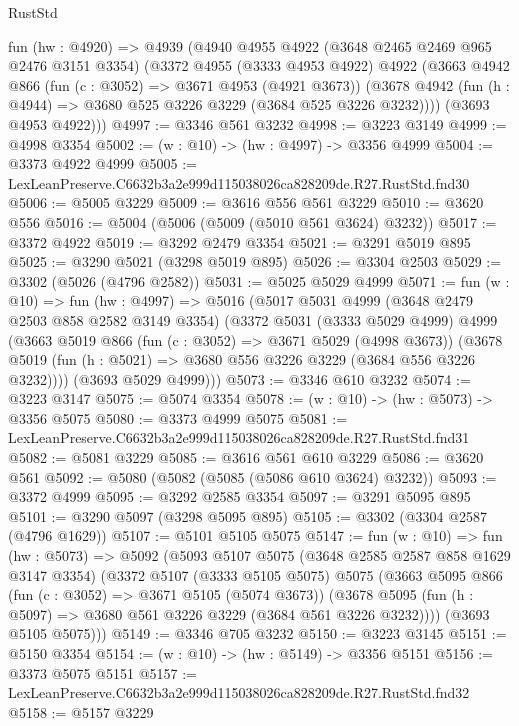 \begin{lexlean}{RustStd}
\begin{coremodule}
  fun (hw : @4920) =>
  @4939
    (@4940
      @4955
      @4922
      (@3648 @2465 @2469 @965 @2476 @3151 @3354)
      (@3372
        @4955
        (@3333 @4953 @4922)
        @4922
        (@3663
          @4942
          @866
          (fun (c : @3052) => @3671 @4953 (@4921 @3673))
          (@3678 @4942 (fun (h : @4944) => @3680 @525 @3226 @3229 (@3684 @525 @3226 @3232))))
        (@3693 @4953 @4922)))
@4997 := @3346 @561 @3232
@4998 := @3223 @3149
@4999 := @4998 @3354
@5002 := (w : @10) -> (hw : @4997) -> @3356 @4999
@5004 := @3373 @4922 @4999
@5005 := LexLeanPreserve.C6632b3a2e999d115038026ca828209de.R27.RustStd.fnd30
@5006 := @5005 @3229
@5009 := @3616 @556 @561 @3229
@5010 := @3620 @556
@5016 := @5004 (@5006 (@5009 (@5010 @561 @3624) @3232))
@5017 := @3372 @4922
@5019 := @3292 @2479 @3354
@5021 := @3291 @5019 @895
@5025 := @3290 @5021 (@3298 @5019 @895)
@5026 := @3304 @2503
@5029 := @3302 (@5026 (@4796 @2582))
@5031 := @5025 @5029 @4999
@5071 := fun (w : @10) =>
  fun (hw : @4997) =>
  @5016
    (@5017
      @5031
      @4999
      (@3648 @2479 @2503 @858 @2582 @3149 @3354)
      (@3372
        @5031
        (@3333 @5029 @4999)
        @4999
        (@3663
          @5019
          @866
          (fun (c : @3052) => @3671 @5029 (@4998 @3673))
          (@3678 @5019 (fun (h : @5021) => @3680 @556 @3226 @3229 (@3684 @556 @3226 @3232))))
        (@3693 @5029 @4999)))
@5073 := @3346 @610 @3232
@5074 := @3223 @3147
@5075 := @5074 @3354
@5078 := (w : @10) -> (hw : @5073) -> @3356 @5075
@5080 := @3373 @4999 @5075
@5081 := LexLeanPreserve.C6632b3a2e999d115038026ca828209de.R27.RustStd.fnd31
@5082 := @5081 @3229
@5085 := @3616 @561 @610 @3229
@5086 := @3620 @561
@5092 := @5080 (@5082 (@5085 (@5086 @610 @3624) @3232))
@5093 := @3372 @4999
@5095 := @3292 @2585 @3354
@5097 := @3291 @5095 @895
@5101 := @3290 @5097 (@3298 @5095 @895)
@5105 := @3302 (@3304 @2587 (@4796 @1629))
@5107 := @5101 @5105 @5075
@5147 := fun (w : @10) =>
  fun (hw : @5073) =>
  @5092
    (@5093
      @5107
      @5075
      (@3648 @2585 @2587 @858 @1629 @3147 @3354)
      (@3372
        @5107
        (@3333 @5105 @5075)
        @5075
        (@3663
          @5095
          @866
          (fun (c : @3052) => @3671 @5105 (@5074 @3673))
          (@3678 @5095 (fun (h : @5097) => @3680 @561 @3226 @3229 (@3684 @561 @3226 @3232))))
        (@3693 @5105 @5075)))
@5149 := @3346 @705 @3232
@5150 := @3223 @3145
@5151 := @5150 @3354
@5154 := (w : @10) -> (hw : @5149) -> @3356 @5151
@5156 := @3373 @5075 @5151
@5157 := LexLeanPreserve.C6632b3a2e999d115038026ca828209de.R27.RustStd.fnd32
@5158 := @5157 @3229

\end{coremodule}
\end{lexlean}
